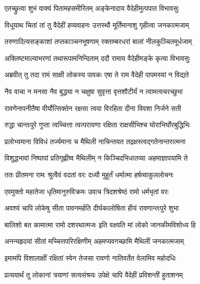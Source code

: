 
\twolineshloka
{एतच्छ्रुत्वा शुभं वाक्यं पितामहसमीरितम्}
{अङ्केनादाय वैदेहीमुत्पपात विभावसुः} %

\twolineshloka
{विधूयाथ चितां तां तु वैदेहीं हव्यवाहनः}
{उत्तस्थौ मूर्तिमानाशु गृहीत्वा जनकात्मजाम्} %

\twolineshloka
{तरुणादित्यसङ्काशां तप्तकाञ्चनभूषणाम्}
{रक्ताम्बरधरां बालां नीलकुञ्चितमूर्धजाम्} %

\twolineshloka
{अक्लिष्टमाल्याभरणां तथारूपामनिन्दिताम्}
{ददौ रामाय वैदेहीमङ्के कृत्वा विभावसुः} %

\twolineshloka
{अब्रवीत् तु तदा रामं साक्षी लोकस्य पावकः}
{एषा ते राम वैदेही पापमस्यां न विद्यते} %

\twolineshloka
{नैव वाचा न मनसा नैव बुद्ध्या न चक्षुषा}
{सुवृत्ता वृत्तशौटीर्यं न त्वामत्यचरच्छुभा} %

\twolineshloka
{रावणेनापनीतैषा वीर्योत्सिक्तेन रक्षसा}
{त्वया विरहिता दीना विवशा निर्जने सती} %

\twolineshloka
{रुद्धा चान्तःपुरे गुप्ता त्वच्चित्ता त्वत्परायणा}
{रक्षिता राक्षसीभिश्च घोराभिर्घोरबुद्धिभिः} %

\twolineshloka
{प्रलोभ्यमाना विविधं तर्ज्यमाना च मैथिली}
{नाचिन्तयत तद्रक्षस्त्वद्गतेनान्तरात्मना} %

\twolineshloka
{विशुद्धभावां निष्पापां प्रतिगृह्णीष्व मैथिलीम्}
{न किञ्चिदभिधातव्या अहमाज्ञापयामि ते} %

\twolineshloka
{ततः प्रीतमना रामः श्रुत्वैवं वदतां वरः}
{दध्यौ मुहूर्तं धर्मात्मा हर्षव्याकुललोचनः} %

\twolineshloka
{एवमुक्तो महातेजा धृतिमानुरुविक्रमः}
{उवाच त्रिदशश्रेष्ठं रामो धर्मभृतां वरः} %

\twolineshloka
{अवश्यं चापि लोकेषु सीता पावनमर्हति}
{दीर्घकालोषिता हीयं रावणान्तःपुरे शुभा} %

\twolineshloka
{बालिशो बत कामात्मा रामो दशरथात्मजः}
{इति वक्ष्यति मां लोको जानकीमविशोध्य हि} %

\twolineshloka
{अनन्यहृदयां सीतां मच्चित्तपरिरक्षिणीम्}
{अहमप्यवगच्छामि मैथिलीं जनकात्मजाम्} %

\twolineshloka
{इमामपि विशालाक्षीं रक्षितां स्वेन तेजसा}
{रावणो नातिवर्तेत वेलामिव महोदधिः} %

\twolineshloka
{प्रत्ययार्थं तु लोकानां त्रयाणां सत्यसंश्रयः}
{उपेक्षे चापि वैदेहीं प्रविशन्तीं हुताशनम्} %

